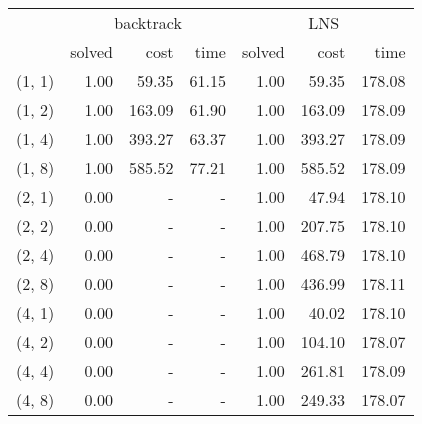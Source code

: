\begin{table}[htb]
  \begin{tabular}{c|rrr|rrr}
    & \multicolumn{3}{c}{backtrack} & \multicolumn{3}{c}{LNS} \\
     & solved & cost & time & solved & cost & time \\
  \hline
    (1, 1) & 1.00 & 59.35 & 61.15 & 1.00 & 59.35 & 178.08 \\
    (1, 2) & 1.00 & 163.09 & 61.90 & 1.00 & 163.09 & 178.09 \\
    (1, 4) & 1.00 & 393.27 & 63.37 & 1.00 & 393.27 & 178.09 \\
    (1, 8) & 1.00 & 585.52 & 77.21 & 1.00 & 585.52 & 178.09 \\
    (2, 1) & 0.00 & - & - & 1.00 & 47.94 & 178.10 \\
    (2, 2) & 0.00 & - & - & 1.00 & 207.75 & 178.10 \\
    (2, 4) & 0.00 & - & - & 1.00 & 468.79 & 178.10 \\
    (2, 8) & 0.00 & - & - & 1.00 & 436.99 & 178.11 \\
    (4, 1) & 0.00 & - & - & 1.00 & 40.02 & 178.10 \\
    (4, 2) & 0.00 & - & - & 1.00 & 104.10 & 178.07 \\
    (4, 4) & 0.00 & - & - & 1.00 & 261.81 & 178.09 \\
    (4, 8) & 0.00 & - & - & 1.00 & 249.33 & 178.07 \\
    \hline
  \end{tabular}
\end{table}
